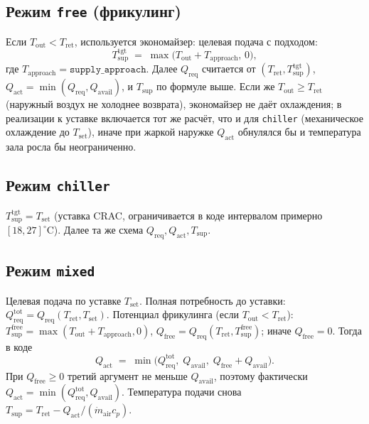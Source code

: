 \documentclass[12pt,a4paper]{article}
\begin{document}
\subsection{Режим \texttt{free} (фрикулинг)}
Если $T_{\mathrm{out}} < T_{\mathrm{ret}}$, используется экономайзер: целевая подача с подходом:
\begin{equation}
  T_{\mathrm{sup}}^{\mathrm{tgt}} \;=\; \max\bigl(T_{\mathrm{out}} + T_{\mathrm{approach}},\, 0\bigr),
\end{equation}
где $T_{\mathrm{approach}} = \texttt{supply\_approach}$. Далее $Q_{\mathrm{req}}$ считается от
$(T_{\mathrm{ret}}, T_{\mathrm{sup}}^{\mathrm{tgt}})$, $Q_{\mathrm{act}} = \min(Q_{\mathrm{req}}, Q_{\mathrm{avail}})$,
и $T_{\mathrm{sup}}$ по формуле выше.
Если же $T_{\mathrm{out}} \ge T_{\mathrm{ret}}$ (наружный воздух не холоднее возврата), экономайзер не
даёт охлаждения; в реализации к уставке включается тот же расчёт, что и для \texttt{chiller}
(механическое охлаждение до $T_{\mathrm{set}}$), иначе при жаркой наружке $Q_{\mathrm{act}}$ обнулялся бы
и температура зала росла бы неограниченно.

\subsection{Режим \texttt{chiller}}
$T_{\mathrm{sup}}^{\mathrm{tgt}} = T_{\mathrm{set}}$ (уставка CRAC, ограничивается в коде интервалом
примерно $[18,27]^\circ\mathrm{C}$). Далее та же схема $Q_{\mathrm{req}}, Q_{\mathrm{act}}, T_{\mathrm{sup}}$.

\subsection{Режим \texttt{mixed}}
Целевая подача по уставке $T_{\mathrm{set}}$. Полная потребность до уставки:
$Q_{\mathrm{req}}^{\mathrm{tot}} = Q_{\mathrm{req}}(T_{\mathrm{ret}}, T_{\mathrm{set}})$.
Потенциал фрикулинга (если $T_{\mathrm{out}} < T_{\mathrm{ret}}$):
$T_{\mathrm{sup}}^{\mathrm{free}} = \max(T_{\mathrm{out}} + T_{\mathrm{approach}}, 0)$,
$Q_{\mathrm{free}} = Q_{\mathrm{req}}(T_{\mathrm{ret}}, T_{\mathrm{sup}}^{\mathrm{free}})$; иначе $Q_{\mathrm{free}} = 0$.
Тогда в коде
\begin{equation}
  Q_{\mathrm{act}} \;=\; \min\bigl(Q_{\mathrm{req}}^{\mathrm{tot}},\; Q_{\mathrm{avail}},\; Q_{\mathrm{free}} + Q_{\mathrm{avail}}\bigr).
\end{equation}
При $Q_{\mathrm{free}} \ge 0$ третий аргумент не меньше $Q_{\mathrm{avail}}$, поэтому фактически
$Q_{\mathrm{act}} = \min(Q_{\mathrm{req}}^{\mathrm{tot}}, Q_{\mathrm{avail}})$. Температура подачи снова
$T_{\mathrm{sup}} = T_{\mathrm{ret}} - Q_{\mathrm{act}}/(\dot m_{\mathrm{air}} c_p)$.
\end{document}
